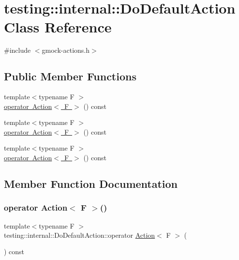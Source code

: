 \hypertarget{classtesting_1_1internal_1_1_do_default_action}{}\section{testing\+::internal\+::Do\+Default\+Action Class Reference}
\label{classtesting_1_1internal_1_1_do_default_action}


{\ttfamily \#include $<$gmock-\/actions.\+h$>$}

\subsection*{Public Member Functions}
\begin{DoxyCompactItemize}
\item 
{\footnotesize template$<$typename F $>$ }\\\mbox{\hyperlink{classtesting_1_1internal_1_1_do_default_action_aea08828a0d64847e29ab7a5abeb74149}{operator Action$<$ F $>$}} () const
\item 
{\footnotesize template$<$typename F $>$ }\\\mbox{\hyperlink{classtesting_1_1internal_1_1_do_default_action_aea08828a0d64847e29ab7a5abeb74149}{operator Action$<$ F $>$}} () const
\item 
{\footnotesize template$<$typename F $>$ }\\\mbox{\hyperlink{classtesting_1_1internal_1_1_do_default_action_aea08828a0d64847e29ab7a5abeb74149}{operator Action$<$ F $>$}} () const
\end{DoxyCompactItemize}


\subsection{Member Function Documentation}
\mbox{\label{classtesting_1_1internal_1_1_do_default_action_aea08828a0d64847e29ab7a5abeb74149}} 
\subsubsection{\texorpdfstring{operator Action$<$ F $>$()}{operator Action< F >()}\hspace{0.1cm}{\footnotesize\ttfamily [1/3]}}
{\footnotesize\ttfamily template$<$typename F $>$ \\
testing\+::internal\+::\+Do\+Default\+Action\+::operator \mbox{\hyperlink{classtesting_1_1_action}{Action}}$<$ F $>$ (\begin{DoxyParamCaption}{ }\end{DoxyParamCaption}) const\hspace{0.3cm}{\ttfamily [inline]}}

